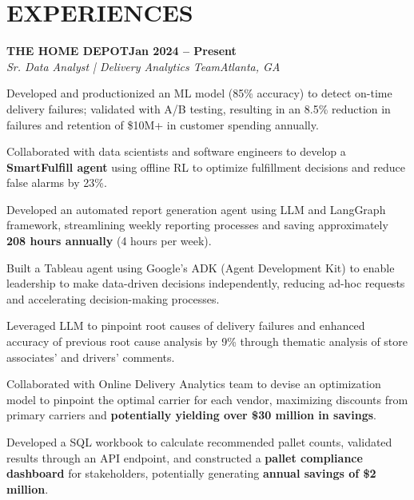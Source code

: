 \documentclass[letterpaper,10pt]{article}
\newcommand{\heading}[2]{
  \hspace{0pt}#1\hfill#2\\
}
\newcommand{\headingBf}[2]{
  \heading{\textbf{#1}}{\textbf{#2}}
}
\newcommand{\headingIt}[2]{
  \heading{\textit{#1}}{\textit{#2}}
  \vspace{0.2em}
}
\newenvironment{resume_list}{
  \vspace{-7pt}
  \begin{itemize}[itemsep=-0.5pt, parsep=1pt, leftmargin=20pt]
}{
  \end{itemize}
}
\begin{document}
\section{EXPERIENCES}
\headingBf{THE HOME DEPOT}{Jan 2024 -- Present}
\headingIt{Sr. Data Analyst | Delivery Analytics Team}{Atlanta, GA}
\begin{justify}
\begin{resume_list}


\item Developed and productionized an ML model (85\% accuracy) to detect on-time delivery failures; validated with A/B testing, resulting in an 8.5\% reduction in failures and retention of \$10M+ in customer spending annually.
\item Collaborated with data scientists and software engineers to develop a \textbf{SmartFulfill agent} using offline RL to optimize fulfillment decisions and reduce false alarms by 23\%.
\item Developed an automated report generation agent using LLM and LangGraph framework, streamlining weekly reporting processes and saving approximately \textbf{208 hours annually} (4 hours per week).

\item Built a Tableau agent using Google's ADK (Agent Development Kit) to enable leadership to make data-driven decisions independently, reducing ad-hoc requests and accelerating decision-making processes.

\item Leveraged LLM to pinpoint root causes of delivery failures and enhanced accuracy of previous root cause analysis by 9\% through thematic analysis of store associates' and drivers' comments.

\item Collaborated with Online Delivery Analytics team to devise an optimization model to pinpoint the optimal carrier for each vendor, maximizing discounts from primary carriers and \textbf{potentially yielding over \$30 million in savings}.

\item Developed a SQL workbook to calculate recommended pallet counts, validated results through an API endpoint, and constructed a \textbf{pallet compliance dashboard} for stakeholders, potentially generating \textbf{annual savings of \$2 million}.

\end{resume_list}
\end{justify}
\end{document}
